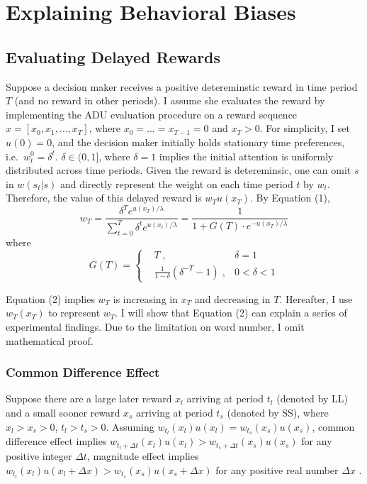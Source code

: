 \documentclass[
  12pt,
]{article}
\begin{document}
\hypertarget{explaining-behavioral-biases}{%
\section{\texorpdfstring{Explaining Behavioral Biases
\label{behavioral}}{Explaining Behavioral Biases }}\label{explaining-behavioral-biases}}

\hypertarget{evaluating-delayed-rewards}{%
\subsection{Evaluating Delayed
Rewards}\label{evaluating-delayed-rewards}}

Suppose a decision maker receives a positive detereminstic reward in
time period \(T\) (and no reward in other periods). I assume she
evaluates the reward by implementing the ADU evaluation procedure on a
reward sequence \(x=[x_0,x_1,…,x_T]\), where \(x_0=…=x_{T-1}=0\) and
\(x_T>0\). For simplicity, I set \(u(0)=0\), and the decision maker
initially holds stationary time preferences, i.e.~\(w^0_t=\delta^t\).
\(\delta\in(0,1]\), where \(\delta=1\) implies the initial attention is
uniformly distributed across time periods. Given the reward is
detereminsic, one can omit \(s\) in \(w(s_t|s)\) and directly represent
the weight on each time period \(t\) by \(w_t\). Therefore, the value of
this delayed reward is \(w_Tu(x_T)\). By Equation (1),\[ \tag{2}
w_T  = \frac{\delta^Te^{u(x_T)/\lambda}}{\sum_{t=0}^T \delta^te^{u(x_t)/\lambda}}  =\frac{1}{1+G(T)\cdot e^{-u(x_T)/\lambda}}
\] where\[
G(T) = \left\{\begin{split}
& T \;, & \delta=1\\
& \frac{1}{1-\delta}(\delta^{-T}-1) \;,&0<\delta<1
\end{split}\right.
\]

Equation (2) implies \(w_T\) is increasing in \(x_T\) and decreasing in
\(T\). Hereafter, I use \(w_T(x_T)\) to represent \(w_T\). I will show
that Equation (2) can explain a series of experimental findings. Due to
the limitation on word number, I omit mathematical proof.

\hypertarget{common-difference-effect}{%
\subsubsection{Common Difference
Effect}\label{common-difference-effect}}

Suppose there are a large later reward \(x_l\) arriving at period
\(t_l\) (denoted by LL) and a small sooner reward \(x_s\) arriving at
period \(t_s\) (denoted by SS), where \(x_l>x_s>0\), \(t_l>t_s>0\).
Assuming \(w_{t_l}(x_l)u(x_l)=w_{t_s}(x_s)u(x_s)\), common difference
effect implies
\(w_{t_l+\Delta t}(x_l)u(x_l)>w_{t_s+\Delta t}(x_s)u(x_s)\) for any
positive integer \(\Delta t\), magnitude effect implies
\(w_{t_l}(x_l)u(x_l+\Delta x)>w_{t_s}(x_s)u(x_s+\Delta x)\) for any
positive real number \(\Delta x\) \citep{loewenstein_anomalies_1992}.
\end{document}
